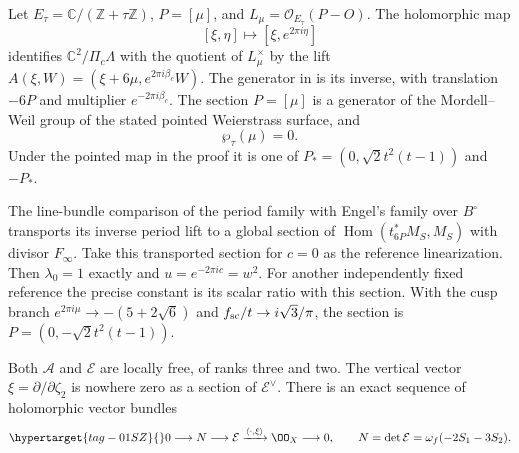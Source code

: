 \begin{proposition}\hypertarget{tag-01Q7}{}\label{fam:src:B.1.1}\label{fam:st:B.1.1}
\hypertarget{tag-01Q9}{}\label{fam:src:B.1.3}\label{fam:st:B.1.3}

Let $E_\tau=\mathbb C/(\mathbb Z+\tau\mathbb Z)$, $P=[\mu]$, and $L_\mu=\mathcal O_{E_\tau}(P-O)$. The holomorphic map
\[
 [\xi,\eta]\longmapsto[\xi,e^{2\pi i\eta}]
\]
identifies $\mathbb C^2/\Pi_c\Lambda$ with the quotient of $L_\mu^\times$ by the lift
$A(\xi,W)=(\xi+6\mu,e^{2\pi i\beta_c}W)$. The generator in \cite[Definition~2.3, p.~5]{Engel2026} is its inverse, with translation $-6P$ and multiplier $e^{-2\pi i\beta_c}$. The section $P=[\mu]$ is a generator of the Mordell--Weil group
of the stated pointed Weierstrass surface, and
\[
 \wp_\tau(\mu)=0.
\]
Under the pointed map in the proof it is one of
$P_*=(0,\sqrt2t^2(t-1))$ and $-P_*$.
\end{proposition}

\begin{proposition}\hypertarget{tag-01QA}{}\label{fam:src:B.1.4}\label{fam:st:B.1.4}

The line-bundle comparison of the period family with Engel's family over $B^\circ$ transports its inverse period lift to a global section of $\operatorname{Hom}(t_{6P}^*M_S,M_S)$ with divisor $F_\infty$. Take this transported section for $c=0$ as the reference linearization. Then $\lambda_0=1$ exactly and $u=e^{-2\pi ic}=w^2$. For another independently fixed reference the precise constant is its scalar ratio with this section. With the cusp branch $e^{2\pi i\mu}\to-(5+2\sqrt6)$ and $f_{\rm sc}/t\to i\sqrt3/\pi$, the section is $P=(0,-\sqrt2t^2(t-1))$.
\end{proposition}

\begin{proposition}\hypertarget{tag-01RR}{}\label{inv:A1.1}

Both $\mathcal A$ and $\mathcal E$ are locally free, of ranks three and
two.  The vertical vector $\xi=\partial/\partial\zeta_2$ is nowhere
zero as a section of $\mathcal E^\vee$.  There is an exact sequence
of holomorphic vector bundles
\begin{equation}\hypertarget{tag-01SZ}{}\label{inv:eq:A-E-line}
0\longrightarrow N\longrightarrow\mathcal E
 \xrightarrow{\langle\cdot,\xi\rangle}\OO_X\longrightarrow0,
\qquad N=\det\mathcal E=\omega_f(-2S_1-3S_2).
\end{equation}
\end{proposition}
